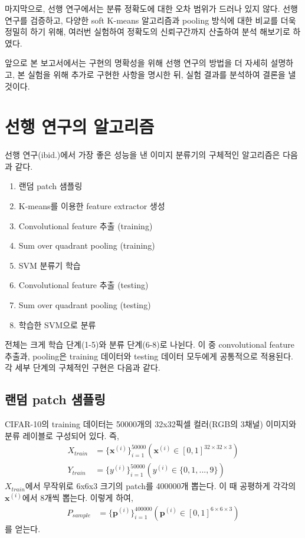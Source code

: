 \documentclass[a4paper,9pt]{article}
\begin{document}
\begin{multicols*}{2}
마지막으로, 선행 연구에서는 분류 정확도에 대한 오차 범위가 드러나 있지 않다.
선행 연구를 검증하고, 다양한 soft K-means 알고리즘과 pooling 방식에 대한 비교를 더욱 정밀히 하기 위해, 여러번 실험하여 정확도의 신뢰구간까지 산출하여 분석 해보기로 하였다.

앞으로 본 보고서에서는 구현의 명확성을 위해 선행 연구의 방법을 더 자세히 설명하고, 본 실험을 위해 추가로 구현한 사항을 명시한 뒤, 실험 결과를 분석하여 결론을 낼 것이다.

\section{선행 연구의 알고리즘}

선행 연구(ibid.)에서 가장 좋은 성능을 낸 이미지 분류기의 구체적인 알고리즘은 다음과 같다.
\begin{enumerate}
\item 랜덤 patch 샘플링
\item K-means를 이용한 feature extractor 생성
\item Convolutional feature 추출 (training)
\item Sum over quadrant pooling (training)
\item SVM 분류기 학습
\item Convolutional feature 추출 (testing)
\item Sum over quadrant pooling (testing)
\item 학습한 SVM으로 분류
\end{enumerate}
전체는 크게 학습 단계(1-5)와 분류 단계(6-8)로 나뉜다.
이 중 convolutional feature 추출과, pooling은 training 데이터와 testing 데이터 모두에게 공통적으로 적용된다.
각 세부 단계의 구체적인 구현은 다음과 같다.

\subsection{랜덤 patch 샘플링}

CIFAR-10의 training 데이터는 50000개의 32x32픽셀 컬러(RGB의 3채널) 이미지와 분류 레이블로 구성되어 있다.
즉,
\begin{align*}
    X_{train} &= \{ \mathbf{x}^{(i)} \}_{i=1}^{50000} ( \mathbf{x}^{(i)} \in [0, 1]^{32 \times 32 \times 3} ) \\
    Y_{train} &= \{ y^{(i)} \}_{i=1}^{50000} ( y^{(i)} \in \{0, 1, ..., 9\} )
\end{align*}
$X_{train}$에서 무작위로 6x6x3 크기의 patch를 400000개 뽑는다.
이 때 공평하게 각각의 $\mathbf{x}^{(i)}$에서 8개씩 뽑는다.
이렇게 하여,
\begin{align*}
    P_{sample} &= \{ \mathbf{p}^{(i)} \}_{i=1}^{400000} ( \mathbf{p}^{(i)} \in [0, 1]^{6 \times 6 \times 3} )
\end{align*}
를 얻는다.


\end{multicols*}
\end{document}
